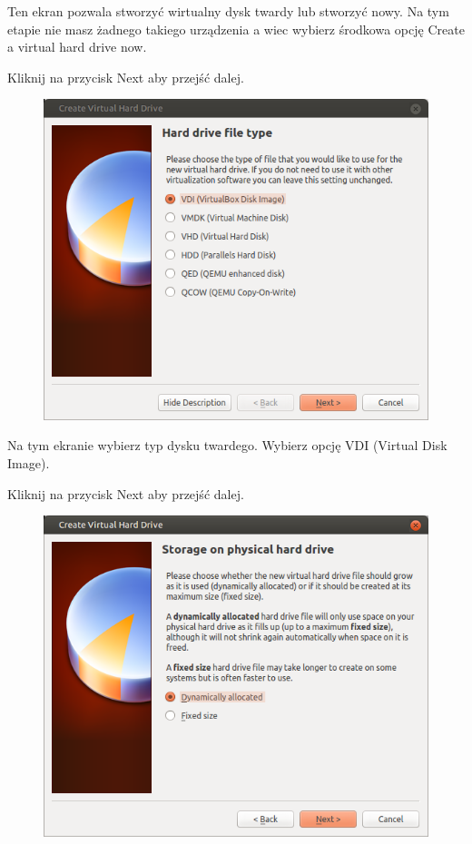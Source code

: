 Ten ekran pozwala stworzyć wirtualny dysk twardy lub stworzyć nowy. Na tym etapie nie masz żadnego takiego urządzenia a wiec wybierz środkowa opcję \textcolor{ubuntu_orange}{Create a virtual hard drive now}.
\begin{flushright}
Kliknij na przycisk \textcolor{ubuntu_orange}{Next} aby przejść dalej.
\end{flushright}
\clearpage
\begin{figure}
                \includegraphics[width=\linewidth]{images/virtualbox_wizard4.png}
\end{figure}

Na tym ekranie wybierz typ dysku twardego. Wybierz opcję \textcolor{ubuntu_orange}{VDI (Virtual Disk Image)}.
\begin{flushright}
Kliknij na przycisk \textcolor{ubuntu_orange}{Next} aby przejść dalej.
\end{flushright}
\clearpage
\begin{figure}
	\includegraphics[width=\linewidth]{images/virtualbox_wizard5.png}
\end{figure}

